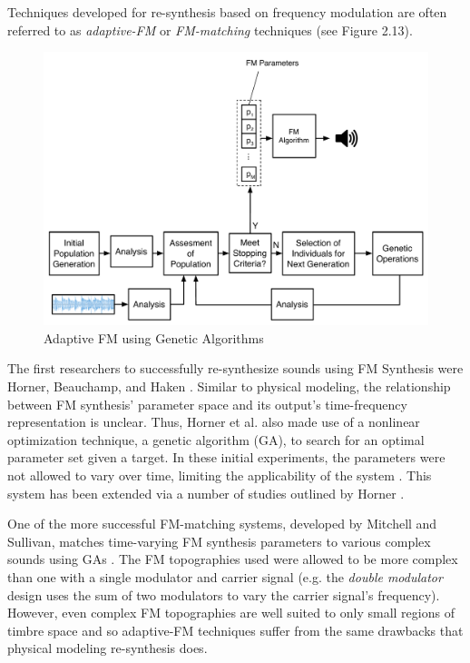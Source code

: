 \documentclass[12pt]{report} 	%
\numberwithin{figure}{chapter}
\numberwithin{table}{chapter}
\numberwithin{equation}{chapter}
\begin{document}
\begin{flushleft}
Techniques developed for re-synthesis based on frequency modulation are often referred to as \textit{adaptive-FM} or \textit{FM-matching} techniques (see Figure 2.13). 
\begin{figure}[h!]
\begin{center}
\includegraphics[scale=0.50]{AdaptiveFM}
\caption[Adaptive FM]{Adaptive FM using Genetic Algorithms}
\end{center}
\end{figure}
The first researchers to successfully re-synthesize sounds using FM Synthesis were Horner, Beauchamp, and Haken \cite{Horner:1993il}. Similar to physical modeling, the relationship between FM synthesis' parameter space and its output's time-frequency representation is unclear. Thus, Horner et al. also made use of a nonlinear optimization technique, a genetic algorithm (GA), to search for an optimal parameter set given a target. In these initial experiments, the parameters were not allowed to vary over time, limiting the applicability of the system \cite[p. 22]{Horner:1993il}. This system has been extended via a number of studies outlined by Horner \cite{Horner:2003ov}. 

One of the more successful FM-matching systems, developed by Mitchell and Sullivan, matches time-varying FM synthesis parameters to various complex sounds using GAs \cite{Mitchell:2005ez}. The FM topographies used were allowed to be more complex than one with a single modulator and carrier signal (e.g. the \textit{double modulator} design uses the sum of two modulators to vary the carrier signal's frequency). However, even complex FM topographies are well suited to only small regions of timbre space and so adaptive-FM techniques suffer from the same drawbacks that physical modeling re-synthesis does.


\end{flushleft}
\end{document}
